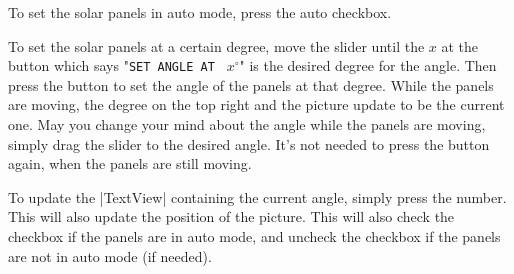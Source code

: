\documentclass{article}
\begin{document}
			To set the solar panels in auto mode, press the auto checkbox. 
			
			To set the solar panels at a certain degree, move the slider until the $x$ at the button which says "\verb|SET ANGLE AT | $x^{\circ}$" is the desired degree for the angle. Then press the button to set the angle of the panels at that degree. While the panels are moving, the degree on the top right and the picture update to be the current one. May you change your mind about the angle while the panels are moving, simply drag the slider to the desired angle. It's not needed to press the button again, when the panels are still moving.
			
			To update the |TextView| containing the current angle, simply press the number. This will also update the position of the picture. This will also check the checkbox if the panels are in auto mode, and uncheck the checkbox if the panels are not in auto mode (if needed).
		
\end{document}
